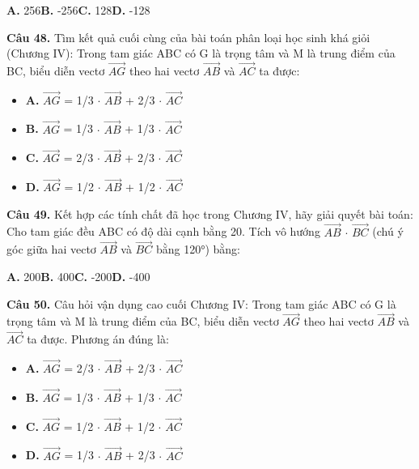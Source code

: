 \documentclass[11pt,a4paper]{article}
\begin{document}
\hspace*{1.5em}\textbf{A.} 256\quad\quad \textbf{B.} -256\quad\quad \textbf{C.} 128\quad\quad \textbf{D.} -128\par\vspace{2pt}
\textbf{\color{primary} Câu 48.} Tìm kết quả cuối cùng của bài toán phân loại học sinh khá giỏi (Chương IV): Trong tam giác ABC có G là trọng tâm và M là trung điểm của BC, biểu diễn vectơ $\overrightarrow{AG}$ theo hai vectơ $\overrightarrow{AB}$ và $\overrightarrow{AC}$ ta được:\par
\begin{itemize}\setlength{\itemsep}{1pt}\setlength{\parskip}{0pt}
  \item[] \textbf{A.} $\overrightarrow{AG}$ = 1/3 $\cdot$ $\overrightarrow{AB}$ + 2/3 $\cdot$ $\overrightarrow{AC}$
  \item[] \textbf{B.} $\overrightarrow{AG}$ = 1/3 $\cdot$ $\overrightarrow{AB}$ + 1/3 $\cdot$ $\overrightarrow{AC}$
  \item[] \textbf{C.} $\overrightarrow{AG}$ = 2/3 $\cdot$ $\overrightarrow{AB}$ + 2/3 $\cdot$ $\overrightarrow{AC}$
  \item[] \textbf{D.} $\overrightarrow{AG}$ = 1/2 $\cdot$ $\overrightarrow{AB}$ + 1/2 $\cdot$ $\overrightarrow{AC}$
\end{itemize}\vspace{2pt}
\textbf{\color{primary} Câu 49.} Kết hợp các tính chất đã học trong Chương IV, hãy giải quyết bài toán: Cho tam giác đều ABC có độ dài cạnh bằng 20. Tích vô hướng $\overrightarrow{AB}$ $\cdot$ $\overrightarrow{BC}$ (chú ý góc giữa hai vectơ $\overrightarrow{AB}$ và $\overrightarrow{BC}$ bằng 120°) bằng:\par
\hspace*{1.5em}\textbf{A.} 200\quad\quad \textbf{B.} 400\quad\quad \textbf{C.} -200\quad\quad \textbf{D.} -400\par\vspace{2pt}
\textbf{\color{primary} Câu 50.} Câu hỏi vận dụng cao cuối Chương IV: Trong tam giác ABC có G là trọng tâm và M là trung điểm của BC, biểu diễn vectơ $\overrightarrow{AG}$ theo hai vectơ $\overrightarrow{AB}$ và $\overrightarrow{AC}$ ta được. Phương án đúng là:\par
\begin{itemize}\setlength{\itemsep}{1pt}\setlength{\parskip}{0pt}
  \item[] \textbf{A.} $\overrightarrow{AG}$ = 2/3 $\cdot$ $\overrightarrow{AB}$ + 2/3 $\cdot$ $\overrightarrow{AC}$
  \item[] \textbf{B.} $\overrightarrow{AG}$ = 1/3 $\cdot$ $\overrightarrow{AB}$ + 1/3 $\cdot$ $\overrightarrow{AC}$
  \item[] \textbf{C.} $\overrightarrow{AG}$ = 1/2 $\cdot$ $\overrightarrow{AB}$ + 1/2 $\cdot$ $\overrightarrow{AC}$
  \item[] \textbf{D.} $\overrightarrow{AG}$ = 1/3 $\cdot$ $\overrightarrow{AB}$ + 2/3 $\cdot$ $\overrightarrow{AC}$
\end{itemize}\vspace{2pt}
\end{document}
